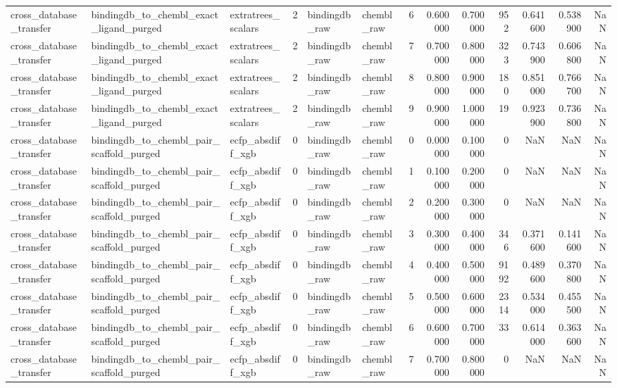 \begin{longtable}{lllrllrrrrrrr}
cross\_database\_transfer & bindingdb\_to\_chembl\_exact\_ligand\_purged & extratrees\_scalars & 2 & bindingdb\_raw & chembl\_raw & 6 & 0.600000 & 0.700000 & 952 & 0.641600 & 0.538900 & NaN \\
cross\_database\_transfer & bindingdb\_to\_chembl\_exact\_ligand\_purged & extratrees\_scalars & 2 & bindingdb\_raw & chembl\_raw & 7 & 0.700000 & 0.800000 & 323 & 0.743900 & 0.606800 & NaN \\
cross\_database\_transfer & bindingdb\_to\_chembl\_exact\_ligand\_purged & extratrees\_scalars & 2 & bindingdb\_raw & chembl\_raw & 8 & 0.800000 & 0.900000 & 180 & 0.851000 & 0.766700 & NaN \\
cross\_database\_transfer & bindingdb\_to\_chembl\_exact\_ligand\_purged & extratrees\_scalars & 2 & bindingdb\_raw & chembl\_raw & 9 & 0.900000 & 1.000000 & 19 & 0.923900 & 0.736800 & NaN \\
cross\_database\_transfer & bindingdb\_to\_chembl\_pair\_scaffold\_purged & ecfp\_absdiff\_xgb & 0 & bindingdb\_raw & chembl\_raw & 0 & 0.000000 & 0.100000 & 0 & NaN & NaN & NaN \\
cross\_database\_transfer & bindingdb\_to\_chembl\_pair\_scaffold\_purged & ecfp\_absdiff\_xgb & 0 & bindingdb\_raw & chembl\_raw & 1 & 0.100000 & 0.200000 & 0 & NaN & NaN & NaN \\
cross\_database\_transfer & bindingdb\_to\_chembl\_pair\_scaffold\_purged & ecfp\_absdiff\_xgb & 0 & bindingdb\_raw & chembl\_raw & 2 & 0.200000 & 0.300000 & 0 & NaN & NaN & NaN \\
cross\_database\_transfer & bindingdb\_to\_chembl\_pair\_scaffold\_purged & ecfp\_absdiff\_xgb & 0 & bindingdb\_raw & chembl\_raw & 3 & 0.300000 & 0.400000 & 346 & 0.371600 & 0.141600 & NaN \\
cross\_database\_transfer & bindingdb\_to\_chembl\_pair\_scaffold\_purged & ecfp\_absdiff\_xgb & 0 & bindingdb\_raw & chembl\_raw & 4 & 0.400000 & 0.500000 & 9192 & 0.489600 & 0.370800 & NaN \\
cross\_database\_transfer & bindingdb\_to\_chembl\_pair\_scaffold\_purged & ecfp\_absdiff\_xgb & 0 & bindingdb\_raw & chembl\_raw & 5 & 0.500000 & 0.600000 & 2314 & 0.534000 & 0.455500 & NaN \\
cross\_database\_transfer & bindingdb\_to\_chembl\_pair\_scaffold\_purged & ecfp\_absdiff\_xgb & 0 & bindingdb\_raw & chembl\_raw & 6 & 0.600000 & 0.700000 & 33 & 0.614000 & 0.363600 & NaN \\
cross\_database\_transfer & bindingdb\_to\_chembl\_pair\_scaffold\_purged & ecfp\_absdiff\_xgb & 0 & bindingdb\_raw & chembl\_raw & 7 & 0.700000 & 0.800000 & 0 & NaN & NaN & NaN \\

\end{longtable}
